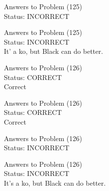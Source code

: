 \documentclass[11pt]{article}
\begin{document}
\begin{minipage}[t]{0.5\textwidth}
  {\centering
  
  Answers to Problem (125)\\
  Status: INCORRECT\\
  
  }
\end{minipage}
\begin{minipage}[t]{0.5\textwidth}
  {\centering
  
  Answers to Problem (125)\\
  Status: INCORRECT\\
  It' a ko, but Black can do better.\\
  }
\end{minipage}
\begin{minipage}[t]{0.5\textwidth}
  {\centering
  
  Answers to Problem (126)\\
  Status: CORRECT\\
  Correct\\
  }
\end{minipage}
\begin{minipage}[t]{0.5\textwidth}
  {\centering
  
  Answers to Problem (126)\\
  Status: CORRECT\\
  Correct\\
  }
\end{minipage}
\begin{minipage}[t]{0.5\textwidth}
  {\centering
  
  Answers to Problem (126)\\
  Status: INCORRECT\\
  
  }
\end{minipage}
\begin{minipage}[t]{0.5\textwidth}
  {\centering
  
  Answers to Problem (126)\\
  Status: INCORRECT\\
  It's a ko, but Black can do better.\\
  }
\end{minipage}
\end{document}
